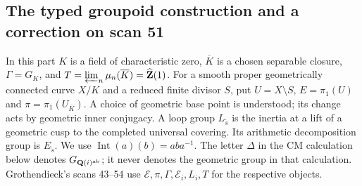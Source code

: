 \subsection{The typed groupoid construction and a correction on scan 51}

In this part $K$ is a field of characteristic zero, $\overline K$ is a
chosen separable closure, $\Gamma=G_K$, and
$T=\varprojlim_n\mu_n(\overline K)=\widehat{\mathbf Z}(1)$.
For a smooth proper geometrically connected curve $X/K$ and a reduced
finite divisor $S$, put $U=X\setminus S$, $E=\pi_1(U)$ and
$\pi=\pi_1(U_{\overline K})$.  A choice of geometric base point is
understood; its change acts by geometric inner conjugacy.  A loop group
$L_{\widetilde s}$ is the inertia at a lift of a geometric cusp to the
completed universal covering.  Its arithmetic decomposition group is
$E_{\widetilde s}$.  We use $\operatorname{Int}(a)(b)=aba^{-1}$.
The letter $\Delta$ in the CM calculation below denotes
$G_{\mathbf Q(i)^{\rm ab}}$; it never denotes the geometric group in
that calculation.  Grothendieck's scans 43--54 use $\mathcal E,\pi,
\Gamma,\mathcal E_i,L_i,T$ for the respective objects.

